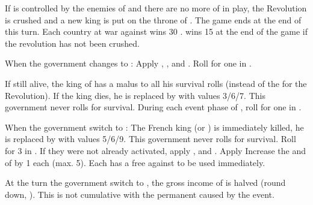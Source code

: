 \phpaix
\aparag If \villeParis is controlled by the enemies of \FRA and there are no
more \ARMY of \FRA in play, the Revolution is crushed and a new king is put on
the throne of \FRA.
\bparag The game ends at the end of this turn.
\bparag Each country at war against \FRA wins 30 \VPs.
\bparag \FRA wins 15 \VPs at the end of the game if the revolution has not
been crushed.

\begin{digressions}



  \phdipl
  \aparag When the government changes to \monarqueConvention:
  \bparag Apply ,
  ,  and
  .
  \bparag Roll for one \REVOLT in \FRA.

  \effetlong
  \aparag If still alive, the king of \FRA has a  malus to all his
  survival rolls (instead of the  for the Revolution).
  \aparag If the king dies, he is replaced by \monarqueConvention with values
  3/6/7. This government never rolls for survival.
  \aparag During each event phase of \monarqueConvention, roll for one \REVOLT
  in \FRA.



  \phdipl
  \aparag When the government switch to \monarqueTerror:
  \bparag The French king (or \monarqueConvention) is immediately killed, he
  is replaced by \monarqueTerror with values 5/6/9. This government never
  rolls for survival.
  \bparag Roll for 3 \REVOLT in \FRA. %
  \bparag If they were not already activated, apply
  ,  and
  .
  \bparag Apply 
  \bparag Increase the \DTI and \FTI of \FRA by 1 each (max. 5).
  \bparag Each \MAJ has a free \CB against \FRA to be used immediately.

  \phadm
  \aparag At the turn the government switch to \monarqueTerror, the gross
  income of \FRA is halved (round down, ). This is not
  cumulative with the permanent  caused by the event.


\end{digressions}
